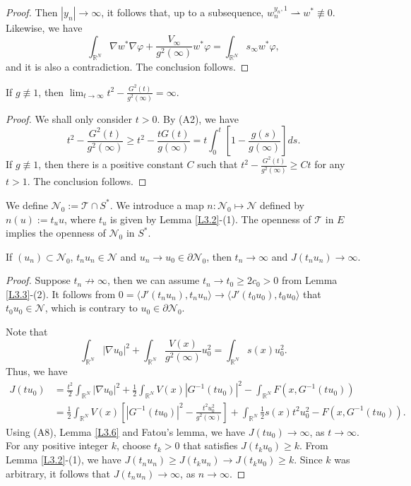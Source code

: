 \documentclass[reqno]{amsart}
\begin{document}
\begin{proof}
Then $|y_n|\to\infty$,  it follows that, up to a subsequence, 
$w_n^{y_n,1} \rightharpoonup w^* \not\equiv 0$. Likewise, we have  
$$
\int_{\mathbb{R}^N}\nabla w^*\nabla\varphi+\frac{V_\infty}{g^2(\infty)}w^*\varphi=\int_{\mathbb{R}^N}s_\infty w^*\varphi,
$$ 
and it is also a contradiction. The conclusion follows.
\end{proof}

\begin{lemma}\label{L3.6} 
If $g\not\equiv1$, then $\lim_{t\to\infty}t^2-\frac{G^2(t)}{g^2(\infty)}=\infty$.
\end{lemma}

\begin{proof}
We  shall only  consider $t>0$. By (A2), we have 
$$
t^2-\frac{G^2(t)}{g^2(\infty)}\geq t^2-\frac{tG(t)}{g(\infty)}
=t \int_{0}^{t}[1-\frac{g(s)}{g(\infty)}]ds.
$$
If  $g\not\equiv1$, then there is a positive constant $C$ such that 
$t^2-\frac{G^2(t)}{g^2(\infty)}\geq Ct$ for any $t>1$. The conclusion follows.
\end{proof}


We define $\mathcal{N}_0:=\mathcal{T}\cap S^*$. We introduce a map 
$n:\mathcal{N}_0\mapsto \mathcal{N}$ defined by $n(u):=t_uu$, where $t_u$ is given 
by Lemma \ref{L3.2}-(1). The openness of $\mathcal{T}$ in $E$ implies the openness of 
$\mathcal{N}_0$ in $S^*$.

\begin{lemma}\label{L3.7} 
If $(u_n)\subset \mathcal{N}_0$, $t_nu_n\in\mathcal{N}$ and 
$u_n\to u_0\in \partial \mathcal{N}_0$, then $t_n\to \infty$ and $J(t_nu_n)\to \infty$.
\end{lemma}

\begin{proof}
Suppose $t_n\not\to\infty$, then we can assume $t_n\to t_0\geq 2 c_0>0$ from 
Lemma \ref{L3.3}-(2).
It follows from $0=\langle J'(t_nu_n),t_nu_n\rangle\to \langle J'(t_0u_0),t_0u_0\rangle$ 
that  $t_0u_0\in\mathcal{N}$, which is contrary to $u_0\in \partial \mathcal{N}_0$.

Note that
$$
\int_{\mathbb{R}^N}|\nabla u_0|^2+\int_{\mathbb{R}^N}\frac{V(x)}{g^2(\infty)}u^2_0=\int_{\mathbb{R}^N}s(x)u^2_0.
$$
Thus, we have 
\begin{align*}
 J(tu_0)&= \frac{t^2}{2}\int_{\mathbb{R}^{N}}|\nabla u_0|^{2}+\frac{1}{2}\int_{\mathbb{R}^N}V(x)|G^{-1}(tu_0)|^2-\int_{\mathbb{R}^{N}}F(x,G^{-1}(tu_0)) \\
        &= \frac{1}{2}\int_{\mathbb{R}^N}V(x)\left[|G^{-1}(tu_0)|^2-\frac{t^2u^2_0}{g^2(\infty)}\right]
        +\int_{\mathbb{R}^{N}}\frac{1}{2}s(x)t^2u^2_0-F(x,G^{-1}(tu_0)).
\end{align*}
Using (A8), Lemma \ref{L3.6} and Fatou's lemma, we have $J(tu_0)\to \infty$, as $t\to\infty$. 
For any positive integer $k$, choose $t_k>0$ that satisfies $J(t_ku_0)\geq k$. 
From Lemma \ref{L3.2}-(1), we have $J(t_nu_n)\geq J(t_ku_n)\to J(t_ku_0)\geq k$. 
Since $k$ was arbitrary, it follows that $J(t_nu_n)\to \infty$, as $n\to\infty$.
\end{proof}
\end{document}
